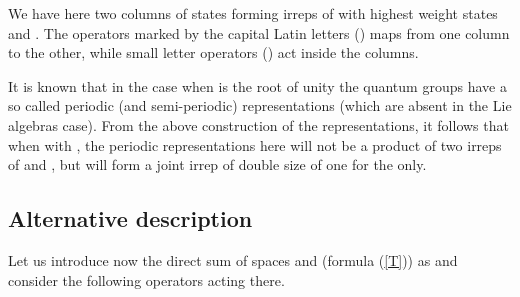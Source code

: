\documentclass[a4paper,a4paper]{article}
\begin{document}


We have here two columns of states forming irreps of \coordHE{}
with highest weight states \coordHE{} and \coordHE{}. The operators marked by
the capital Latin 
letters (\coordHE{}) maps from one column to the other, while small
letter operators (\coordHE{}) act inside the columns.

It is known that in the case when \coordHE{} is the root of unity the quantum
groups have a so called periodic (and semi-periodic) representations
(which are absent in the Lie algebras case). From the above construction 
of the representations, it follows that when
\coordHE{} with \coordHE{}, the periodic representations
here will not be a product of two irreps of \myHighlight{$\cW$}\coordHE{} and \coordHE{},
but will form a joint irrep of double size of one for the
\coordHE{} only.

\subsection{Alternative description}

Let us introduce now the direct sum of spaces \coordHE{} and \coordHE{}
(formula (\ref{T})) as  \coordHE{} and consider the following
operators acting there.
\medskip
\end{document}
